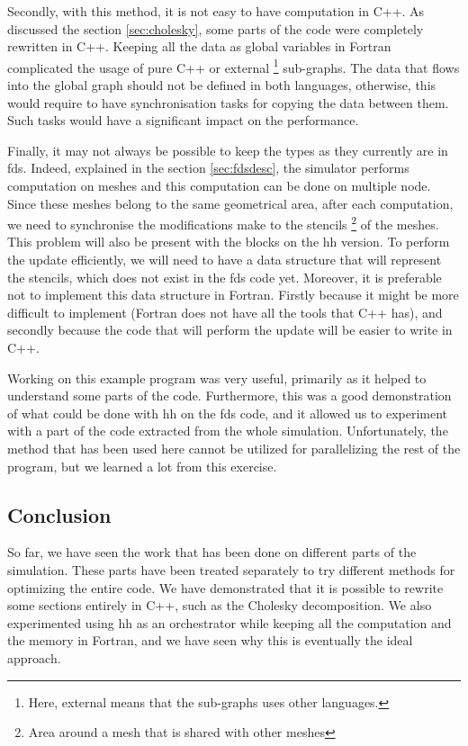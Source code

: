Secondly, with this method, it is not easy to have computation in C++. As
discussed the section \ref{sec:cholesky}, some parts of the code were completely
rewritten in C++. Keeping all the data as global variables in Fortran
complicated the usage of pure C++ or external \footnote{Here, external means
that the sub-graphs uses other languages.} sub-graphs. The data that flows into
the global graph should not be defined in both languages, otherwise, this would
require to have synchronisation tasks for copying the data between them. Such
tasks would have a significant impact on the performance.

Finally, it may not always be possible to keep the types as they currently are
in \gls{fds}. Indeed, explained in the section \ref{sec:fdsdesc}, the simulator
performs computation on meshes and this computation can be done on multiple
node. Since these meshes belong to the same geometrical area, after each
computation, we need to synchronise the modifications make to the
stencils \footnote{Area around a mesh that is shared with other meshes} of the
meshes. This problem will also be present with the blocks on the \gls{hh}
version. To perform the update efficiently, we will need to have a data
structure that will represent the stencils, which does not
exist in the \gls{fds} code yet. Moreover, it is preferable not to implement
this data structure in Fortran. Firstly because it might be more difficult to
implement (Fortran does not have all the tools that C++ has), and secondly
because the code that will perform the update will be easier to write in C++.

Working on this example program was very useful, primarily as it helped to
understand some parts of the code. Furthermore, this was a good demonstration
of what could be done with \gls{hh} on the \gls{fds} code, and it allowed us to
experiment with a part of the code extracted from the whole simulation.
Unfortunately, the method that has been used here cannot be utilized for
parallelizing the rest of the program, but we learned a lot from this exercise.

\subsection{Conclusion}
\label{sec:fdsconcl}

So far, we have seen the work that has been done on different parts of the
simulation. These parts have been treated separately to try different methods
for optimizing the entire code. We have demonstrated that it is possible to
rewrite some sections entirely in C++, such as the Cholesky decomposition. We
also experimented using \gls{hh} as an orchestrator while keeping all the
computation and the memory in Fortran, and we have seen why this is eventually
the ideal approach.

